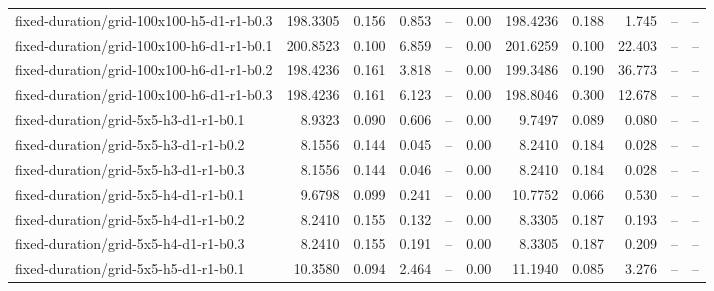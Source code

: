\documentclass[10pt]{article}
\begin{document}
\begin{tabular}{p{65mm}rrrrrrrrrr}
fixed-\allowbreak duration/\allowbreak grid-\allowbreak 100x100-\allowbreak h5-\allowbreak d1-\allowbreak r1-\allowbreak b0.3 & 198.3305 & 0.156 & 0.853 & -- & 0.00 & 198.4236 & 0.188 & 1.745 & -- & -- \\
fixed-\allowbreak duration/\allowbreak grid-\allowbreak 100x100-\allowbreak h6-\allowbreak d1-\allowbreak r1-\allowbreak b0.1 & 200.8523 & 0.100 & 6.859 & -- & 0.00 & 201.6259 & 0.100 & 22.403 & -- & -- \\
fixed-\allowbreak duration/\allowbreak grid-\allowbreak 100x100-\allowbreak h6-\allowbreak d1-\allowbreak r1-\allowbreak b0.2 & 198.4236 & 0.161 & 3.818 & -- & 0.00 & 199.3486 & 0.190 & 36.773 & -- & -- \\
fixed-\allowbreak duration/\allowbreak grid-\allowbreak 100x100-\allowbreak h6-\allowbreak d1-\allowbreak r1-\allowbreak b0.3 & 198.4236 & 0.161 & 6.123 & -- & 0.00 & 198.8046 & 0.300 & 12.678 & -- & -- \\
fixed-\allowbreak duration/\allowbreak grid-\allowbreak 5x5-\allowbreak h3-\allowbreak d1-\allowbreak r1-\allowbreak b0.1 & 8.9323 & 0.090 & 0.606 & -- & 0.00 & 9.7497 & 0.089 & 0.080 & -- & -- \\
fixed-\allowbreak duration/\allowbreak grid-\allowbreak 5x5-\allowbreak h3-\allowbreak d1-\allowbreak r1-\allowbreak b0.2 & 8.1556 & 0.144 & 0.045 & -- & 0.00 & 8.2410 & 0.184 & 0.028 & -- & -- \\
fixed-\allowbreak duration/\allowbreak grid-\allowbreak 5x5-\allowbreak h3-\allowbreak d1-\allowbreak r1-\allowbreak b0.3 & 8.1556 & 0.144 & 0.046 & -- & 0.00 & 8.2410 & 0.184 & 0.028 & -- & -- \\
fixed-\allowbreak duration/\allowbreak grid-\allowbreak 5x5-\allowbreak h4-\allowbreak d1-\allowbreak r1-\allowbreak b0.1 & 9.6798 & 0.099 & 0.241 & -- & 0.00 & 10.7752 & 0.066 & 0.530 & -- & -- \\
fixed-\allowbreak duration/\allowbreak grid-\allowbreak 5x5-\allowbreak h4-\allowbreak d1-\allowbreak r1-\allowbreak b0.2 & 8.2410 & 0.155 & 0.132 & -- & 0.00 & 8.3305 & 0.187 & 0.193 & -- & -- \\
fixed-\allowbreak duration/\allowbreak grid-\allowbreak 5x5-\allowbreak h4-\allowbreak d1-\allowbreak r1-\allowbreak b0.3 & 8.2410 & 0.155 & 0.191 & -- & 0.00 & 8.3305 & 0.187 & 0.209 & -- & -- \\
fixed-\allowbreak duration/\allowbreak grid-\allowbreak 5x5-\allowbreak h5-\allowbreak d1-\allowbreak r1-\allowbreak b0.1 & 10.3580 & 0.094 & 2.464 & -- & 0.00 & 11.1940 & 0.085 & 3.276 & -- & -- \\

\end{tabular}
\end{document}
